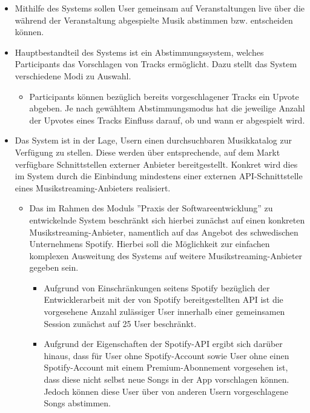 \documentclass[oneside, ngerman]{sdqtechreport}
\begin{document}
\begin{itemize}
    \item Mithilfe des Systems sollen User gemeinsam auf Veranstaltungen live über die während der Veranstaltung abgespielte Musik abstimmen bzw. entscheiden können.
    \item Hauptbestandteil des Systems ist ein Abstimmungssystem, welches Participants das Vorschlagen von Tracks ermöglicht. Dazu stellt das System verschiedene Modi zu Auswahl.
    \begin{itemize}
        \item Participants können bezüglich bereits vorgeschlagener Tracks ein Upvote abgeben. Je nach gewähltem Abstimmungsmodus hat die jeweilige Anzahl der Upvotes eines Tracks Einfluss darauf, ob und wann er abgespielt wird.
    \end{itemize}
    \item Das System ist in der Lage, Usern einen durchsuchbaren Musikkatalog zur Verfügung zu stellen. Diese werden über entsprechende, auf dem Markt verfügbare Schnittstellen externer Anbieter bereitgestellt. Konkret wird dies im System durch die Einbindung mindestens einer externen API-Schnittstelle eines Musikstreaming-Anbieters realisiert.
    \begin{itemize}
        \item Das im Rahmen des Moduls ''Praxis der Softwareentwicklung'' zu entwickelnde System beschränkt sich hierbei zunächst auf einen konkreten Musikstreaming-Anbieter, namentlich auf das Angebot des schwedischen Unternehmens Spotify. Hierbei soll die Möglichkeit zur einfachen komplexen Ausweitung des Systems auf weitere Musikstreaming-Anbieter gegeben sein.
        \begin{itemize}
            \item Aufgrund von Einschränkungen seitens Spotify bezüglich der Entwicklerarbeit mit der von Spotify bereitgestellten API ist die vorgesehene Anzahl zulässiger User innerhalb einer gemeinsamen Session zunächst auf 25 User beschränkt.
            \item Aufgrund der Eigenschaften der Spotify-API ergibt sich darüber hinaus, dass für User ohne Spotify-Account sowie User ohne einen Spotify-Account mit einem Premium-Abonnement vorgesehen ist, dass diese nicht selbst neue Songs in der App vorschlagen können. Jedoch können diese User über von anderen Usern vorgeschlagene Songs abstimmen.
        \end{itemize}


\end{itemize}
\end{itemize}
\end{document}
